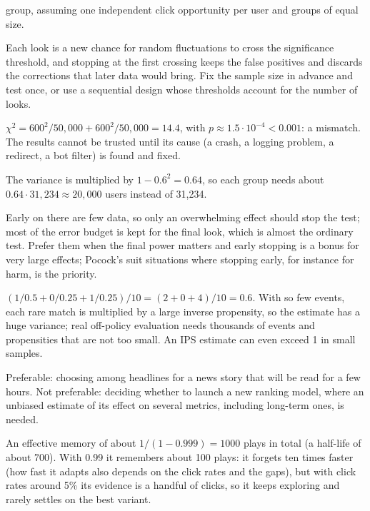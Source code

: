 \begin{description}[font=\bfseries,leftmargin=0pt,itemsep=5pt]
        group, assuming one independent click opportunity per user and groups of equal size.
  \item[\ref{exr6:peek}] Each look is a new chance for random fluctuations to cross the significance threshold, and stopping at the first
        crossing keeps the false positives and discards the corrections that later data would bring. Fix the sample size in advance
        and test once, or use a sequential design whose thresholds account for the number of looks.
  \item[\ref{exr6:srm}] $\chi^2=600^2/50{,}000+600^2/50{,}000=14.4$, with $p\approx1.5\cdot10^{-4}<0.001$: a mismatch. The results cannot be
        trusted until its cause (a crash, a logging problem, a redirect, a bot filter) is found and fixed.
  \item[\ref{exr6:cuped}] The variance is multiplied by $1-0.6^2=0.64$, so each group needs about $0.64\cdot31{,}234\approx20{,}000$ users instead
        of 31,234.
  \item[\ref{exr6:obf}] Early on there are few data, so only an overwhelming effect should stop the test; most of the error budget is kept for
        the final look, which is almost the ordinary test. Prefer them when the final power matters and early stopping is a bonus for very
        large effects; Pocock's suit situations where stopping early, for instance for harm, is the priority.
  \item[\ref{exr6:ips}] $(1/0.5+0/0.25+1/0.25)/10=(2+0+4)/10=0.6$. With so few events, each rare match is multiplied by a large inverse propensity,
        so the estimate has a huge variance; real off-policy evaluation needs thousands of events and propensities that are not too small. An IPS
        estimate can even exceed 1 in small samples.
  \item[\ref{exr6:bandit}] Preferable: choosing among headlines for a news story that will be read for a few hours. Not preferable: deciding
        whether to launch a new ranking model, where an unbiased estimate of its effect on several metrics, including long-term ones,
        is needed.
  \item[\ref{exr6:discount}] An effective memory of about $1/(1-0.999)=1000$ plays in total (a half-life of about 700). With 0.99 it remembers
        about 100 plays: it forgets ten times faster (how fast it adapts also depends on the click rates and the
        gaps), but with click rates around 5\% its evidence is a handful of clicks, so it keeps exploring and rarely settles on the best variant.

\end{description}
